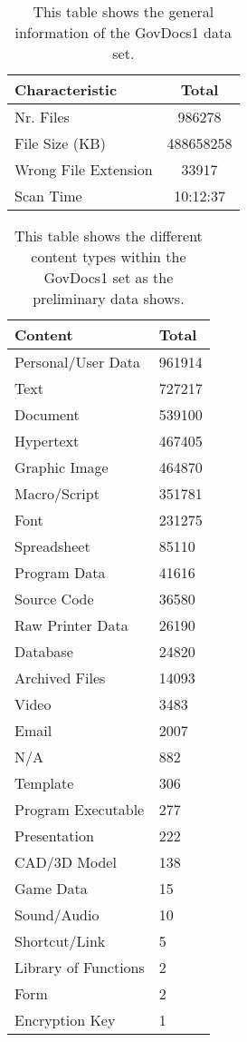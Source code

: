 \begin{table}
\centering
\begin{tabular}{l || c }
\hline
Characteristic & Total \\
\hline
\hline
Nr. Files & 986278 \\
File Size (KB) & 488658258 \\
Wrong File Extension & 33917 \\
Scan Time & 10:12:37 \\
\hline
\end{tabular}
\caption{This table shows the general information of the GovDocs1 data set.}
\label{tab:govdoc1_general_info}
\end{table}

\begin{table}
\centering
\begin{tabular}{l || l }
\hline
Content & Total \\
\hline
\hline
  Personal/User Data & 961914\\
  Text & 727217 \\
  Document & 539100 \\
  Hypertext & 467405 \\
  Graphic Image & 464870 \\
  Macro/Script &    351781 \\
  Font & 231275 \\
  Spreadsheet & 85110\\
  Program Data  &      41616\\
  Source Code & 36580 \\
  Raw Printer Data &  26190 \\
  Database & 24820 \\
  Archived Files & 14093 \\
  Video &  3483 \\
  Email & 2007 \\
  N/A  & 882 \\
  Template & 306\\
  Program Executable & 277\\
  Presentation & 222 \\
  CAD/3D Model & 138 \\
  Game Data &15\\
  Sound/Audio & 10 \\
  Shortcut/Link & 5 \\
  Library of Functions & 2\\
  Form & 2 \\
  Encryption Key  & 1\\
\hline
\end{tabular}
\label{tab:govdoc1_content}
\caption{This table shows the different content types within the GovDocs1 set as the preliminary data shows.}
\end{table}

